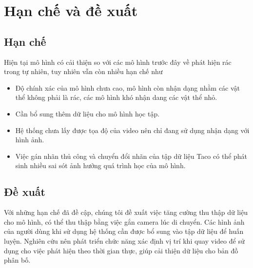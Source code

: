 \documentclass[../the.tex]{subfiles}
\begin{document}
\section{Hạn chế và đề xuất}
\subsection{Hạn chế}
{\fontsize{13}{12} \selectfont
Hiện tại mô hình có cải thiện so với các mô hình trước đây về phát hiện rác trong tự nhiên, tuy nhiên vẫn còn nhiều hạn chế như
\begin{itemize}
    \item Độ chính xác của mô hình chưa cao, mô hình còn nhận dạng nhằm các vật thể không phải là rác, các mô hình khó nhận dang các vật thể nhỏ.
    \item Cần bổ sung thêm dữ liệu cho mô hình học tập.
    \item Hệ thống chưa lấy được tọa độ của video nên chỉ đang sử dụng nhận dạng với hình ảnh.
    \item Việc gán nhãn thủ công và chuyển đổi nhãn của tập dữ liệu Taco có thể phát sinh nhiều sai sót ảnh hưởng quá trình học của mô hình.	
\end{itemize}
}
\subsection{Đề xuất}
{\fontsize{13}{12} \selectfont 
Với những hạn chế đã đề cập, chúng tôi đề xuất việc tăng cường thu thập dữ liệu cho mô hình, có thể thu thập bằng việc gắn camera lúc di chuyển.
Các hình ảnh của người dùng khi sử dụng hệ thống cần được bổ sung vào tập dữ liệu để huấn luyện.
Nghiên cứu nên phát triển chức năng xác định vị trí khi quay video để sử dụng cho việc phát hiện theo thời gian thực, giúp cải thiện dữ liệu cho bản đồ phân bố.
}
\end{document}
